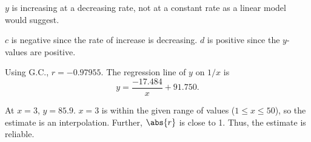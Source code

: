 \begin{solution}
    \begin{ppart}
        \begin{figure}[H]
            \centering
        \end{figure}
    \end{ppart}
    \begin{ppart}
        $y$ is increasing at a decreasing rate, not at a constant rate as a linear model would suggest.
    \end{ppart}
    \begin{ppart}
        $c$ is negative since the rate of increase is decreasing. $d$ is positive since the $y$-values are positive.
    \end{ppart}
    \begin{ppart}
        Using G.C., $r = -0.97955$. The regression line of $y$ on $1/x$ is \[y = \frac{-17.484}{x} + 91.750.\]
    \end{ppart}
    \begin{ppart}
        At $x = 3$, $y = 85.9$. $x = 3$ is within the given range of values ($1 \leq x \leq 50$), so the estimate is an interpolation. Further, $\abs{r}$ is close to 1. Thus, the estimate is reliable.
    \end{ppart}
\end{solution}

